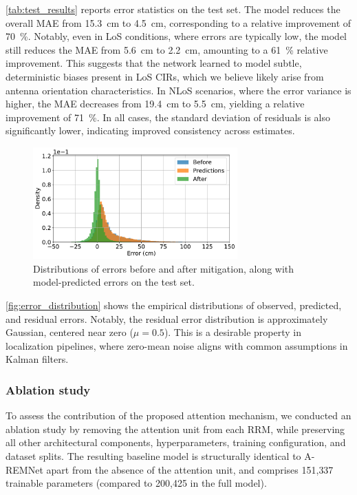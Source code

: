 \autoref{tab:test_results} reports error statistics on the test set. The model reduces the overall MAE from \SI{15.3}{\centi\metre} to \SI{4.5}{\centi\metre}, corresponding to a relative improvement of \SI{70}{\percent}. Notably, even in LoS conditions, where errors are typically low, the model still reduces the MAE from \SI{5.6}{\centi\metre} to \SI{2.2}{\centi\metre}, amounting to a \SI{61}{\percent} relative improvement. This suggests that the network learned to model subtle, deterministic biases present in LoS CIRs, which we believe likely arise from antenna orientation characteristics. In NLoS scenarios, where the error variance is higher, the MAE decreases from \SI{19.4}{\centi\metre} to \SI{5.5}{\centi\metre}, yielding a relative improvement of \SI{71}{\percent}. In all cases, the standard deviation of residuals is also significantly lower, indicating improved consistency across estimates.

\begin{figure}[tbh] 
\centering 
\includegraphics[width=0.7\textwidth]{Graphics/error_distribution_mitigated.pdf} \caption[Distributions of errors before and after mitigation.]{Distributions of errors before and after mitigation, along with model-predicted errors on the test set.} \label{fig:error_distribution} 
\end{figure}

\autoref{fig:error_distribution} shows the empirical distributions of observed, predicted, and residual errors. Notably, the residual error distribution is approximately Gaussian, centered near zero ($\mu = 0.5$). This is a desirable property in localization pipelines, where zero-mean noise aligns with common assumptions in Kalman filters.

\subsubsection{Ablation study}
To assess the contribution of the proposed attention mechanism, we conducted an ablation study by removing the attention unit from each RRM, while preserving all other architectural components, hyperparameters, training configuration, and dataset splits. The resulting baseline model is structurally identical to A-REMNet apart from the absence of the attention unit, and comprises 151{,}337 trainable parameters (compared to 200{,}425 in the full model).

